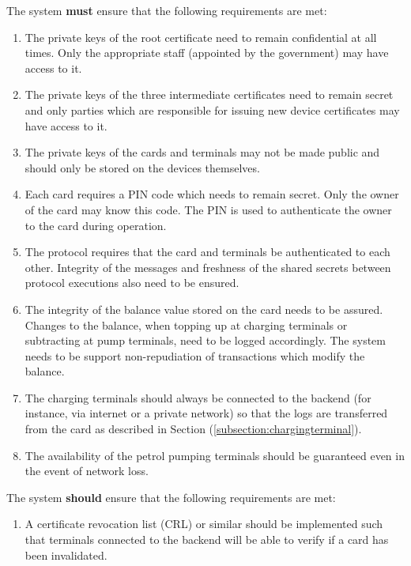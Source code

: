 \documentclass[a4paper,10pt]{llncs}
\begin{document}
The system {\bf must} ensure that the following requirements are met:
\begin{enumerate}
  \item The private keys of the root certificate need to remain confidential at all times. Only the appropriate staff (appointed by the government) may have access to it. 
  \item The private keys of the three intermediate certificates need to remain secret and only parties which are responsible for issuing new device certificates may have access to it.
  \item The private keys of the cards and terminals may not be made public and should only be stored on the devices themselves.
  \item Each card requires a PIN code which needs to remain secret. Only the owner of the card may know this code. The PIN is used to authenticate the owner to the card during operation.
  \item The protocol requires that the card and terminals be authenticated to each other. Integrity of the messages and freshness of the shared secrets between protocol executions also need to be ensured.
  \item The integrity of the balance value stored on the card needs to be assured. Changes to the balance, when topping up at charging terminals or subtracting at pump terminals, need to be logged accordingly. The system needs to be support non-repudiation of transactions which modify the balance.
  \item The charging terminals should always be connected to the backend (for instance, via internet or a private network) so that the logs are transferred from the card as described in Section (\ref{subsection:chargingterminal}).
  \item The availability of the petrol pumping terminals should be guaranteed even in the event of network loss. 
  
\end{enumerate}

The system {\bf should} ensure that the following requirements are met:
\begin{enumerate}
  \item A certificate revocation list (CRL) or similar should be implemented such that terminals connected to the backend will be able to verify if a card has been invalidated.
\end{enumerate}
\end{document}
